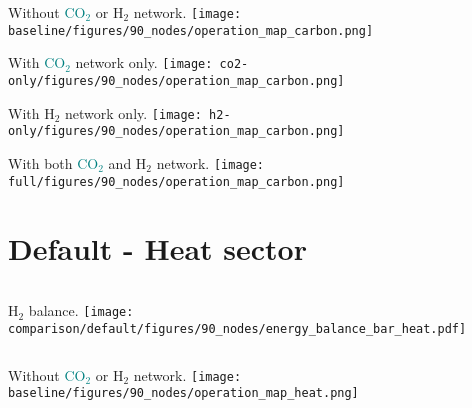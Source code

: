 \documentclass[12pt, aspectratio=169]{beamer}
\newcommand{\carbon}{\textcolor{teal}{CO$_2$}}
\newcommand{\hydrogen}{H$_2$}
\begin{document}
\begin{frame}
    \begin{center}
    Without \carbon{} or \hydrogen{} network.
    \texttt{[image: baseline/figures/90\_nodes/operation\_map\_carbon.png]}
    \end{center}
\end{frame}


\begin{frame}
    \begin{center}
    With \carbon{} network only.
    \texttt{[image: co2-only/figures/90\_nodes/operation\_map\_carbon.png]}
    \end{center}
\end{frame}

\begin{frame}
    \begin{center}
    With \hydrogen{} network only.
    \texttt{[image: h2-only/figures/90\_nodes/operation\_map\_carbon.png]}
    \end{center}
\end{frame}


\begin{frame}
    \begin{center}
    With both \carbon{}  and \hydrogen{} network.
    \texttt{[image: full/figures/90\_nodes/operation\_map\_carbon.png]}
    \end{center}
\end{frame}





\section*{Default - Heat sector}

\begin{frame}
    \begin{columns}
        \hydrogen{} balance.
        \texttt{[image: comparison/default/figures/90\_nodes/energy\_balance\_bar\_heat.pdf]}
    \end{columns}
\end{frame}


\begin{frame}
    \begin{center}
    Without \carbon{} or \hydrogen{} network.
    \texttt{[image: baseline/figures/90\_nodes/operation\_map\_heat.png]}
    \end{center}
\end{frame}
\end{document}
